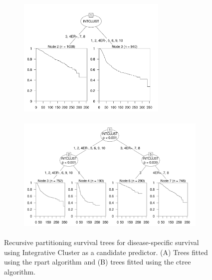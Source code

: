 \begin{figure}[!h]
\begin{minipage}{.44\textwidth}
\begin{subfigure}{\textwidth}
\subcaption{}
\includegraphics[width=\linewidth, height = 5.7cm]{../figures/Chapter_3/Ind_Partykit_Survival_Score_DSS_INTCLUST.png}
\end{subfigure}\par
\end{minipage}
\begin{minipage}{.55\textwidth}
\begin{subfigure}{\textwidth}
\subcaption{}
\includegraphics[width=\linewidth, height = 5.7cm]{../figures/Chapter_3/Ind_Ctree_Survival_Score_DSS_INTCLUST.png}
\end{subfigure}\par
\end{minipage}

\caption[Recursive partitioning survival trees for disease-specific survival using Integrative Cluster as a candidate predictor.]{Recursive partitioning survival trees for disease-specific survival using Integrative Cluster as a candidate predictor. (A) Trees fitted using the rpart algorithm and (B) trees fitted using the ctree algorithm.}
\label{fig:IC_Indv_Surv_Trees}
\end{figure}

